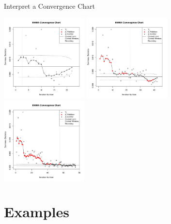 \documentclass[ xcolor = pdftex, dvipsnames, table ]{beamer}
\begin{document}
%
%

\subsection{}
\begin{frame}{Interpret a Convergence Chart}	
\begin{center}
\vspace{-0.5cm}
\includegraphics[width=0.33\textwidth]{exampleEWMAL.pdf}
\includegraphics[width=0.33\textwidth]{exampleEWMAM.pdf}
\includegraphics[width=0.33\textwidth]{exampleEWMAR.pdf}
\end{center}
\end{frame}

%
%

\section{Examples}
\end{document}
